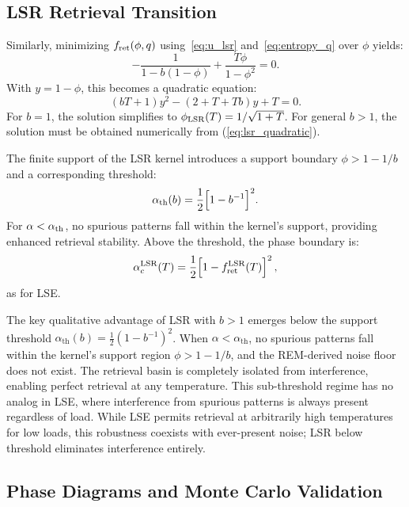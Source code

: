 \documentclass{article}
\theoremstyle{plain}
\theoremstyle{definition}
\theoremstyle{remark}
\begin{document}
\subsection{LSR Retrieval Transition}

Similarly, minimizing $f_{\rm ret}(\phi, q)$ using~\eqref{eq:u_lsr} and~\eqref{eq:entropy_q} over $\phi$ yields:
\begin{equation}
    -\frac{1}{1 - b(1-\phi)} + \frac{T\phi}{1-\phi^2} = 0.
\end{equation}
With $y = 1 - \phi$, this becomes a quadratic equation:
\begin{equation}
    (bT + 1)y^2 - (2 + T + Tb)y + T = 0.
    \label{eq:lsr_quadratic}
\end{equation}
For $b = 1$, the solution simplifies to $\phi_{\rm LSR}(T) = 1/\sqrt{1+T}$. For general $b > 1$, the solution must be obtained numerically from (\ref{eq:lsr_quadratic}).

The finite support of the LSR kernel introduces a support boundary $\phi > 1 - 1/b$ and a corresponding threshold:
\begin{equation}
    \alpha_{\rm th}(b) = \frac{1}{2}\Big[1 - b^{-1}\Big]^2.
\end{equation}
For $\alpha < \alpha_{\rm th}$, no spurious patterns fall within the kernel's support, providing enhanced retrieval stability. Above the threshold, the phase boundary is:
\begin{equation}
    \alpha_c^{\rm LSR}(T) = \frac{1}{2} \Big[1 - f_{\rm ret}^{\rm LSR}(T) \Big]^2\,,
    \label{eq:alpha_lsr}
\end{equation}
as for LSE.

The key qualitative advantage of LSR with $b > 1$ emerges below the support threshold $\alpha_{\text{th}}(b) = \frac{1}{2}(1 - b^{-1})^2$. When $\alpha < \alpha_{\text{th}}$, no spurious patterns fall within the kernel's support region $\phi > 1 - 1/b$, and the REM-derived noise floor does not exist. The retrieval basin is completely isolated from interference, enabling perfect retrieval at any temperature. This sub-threshold regime has no analog in LSE, where interference from spurious patterns is always present regardless of load. While LSE permits retrieval at arbitrarily high temperatures for low loads, this robustness coexists with ever-present noise; LSR below threshold eliminates interference entirely.


\subsection{Phase Diagrams and Monte Carlo Validation}
\end{document}
